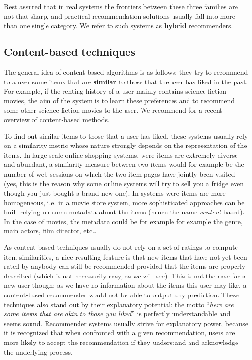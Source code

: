 Rest assured that in real systems the frontiers between these three families
are not that sharp, and practical recommendation solutions usually fall into
more than one single category. We refer to such systems as \textbf{hybrid}
recommenders.

\subsection{Content-based techniques}

The general idea of content-based algorithms is as follows: they try to recommend to a user some items that are
\textbf{similar} to those that the user has liked in the past. For example, if
the renting history of a user mainly contains science fiction movies, the aim
of the system is to learn these preferences and to recommend some other science
fiction movies to the user. We recommend \cite{LopGemSem11} for a recent
overview of content-based methods.

To find out similar items to those that a user has liked, these systems usually
rely on a similarity metric whose nature strongly depends on the representation
of the items. In large-scale online shopping systems, were items are extremely
diverse and abundant, a similarity measure between two items would for
example be the number of web sessions on which the two item pages have jointly
been visited (yes, this is the reason why some online systems will try to sell
you a fridge even though you just bought a brand new one). In systems were
items are more homogeneous, i.e. in a movie store system, more  sophisticated
approaches can be built relying on some metadata about the items (hence the
name \textit{content}-based). In the case of movies, the metadata could be for
example for example the genre, main actors, film director, etc\dots

As content-based techniques usually do not rely on a set of ratings to compute item
similarities, a nice resulting feature is that new items that have not yet been
rated by anybody can still be recommended provided that the items are properly
described (which is not necessarily easy, as we will see). This is not the case for a new user
though: as we have no information about the items this user may like, a
content-based recommender would not be able to output any prediction. These
techniques also stand out by their explanatory potential: the motto
``\textit{here are some items that are akin to those you liked}'' is perfectly
understandable and seems sound.  Recommender systems usually strive for
explanatory power, because it is recognized that when confronted with a given
recommendation, users are more likely to accept the recommendation if they
understand and acknowledge the underlying process.

